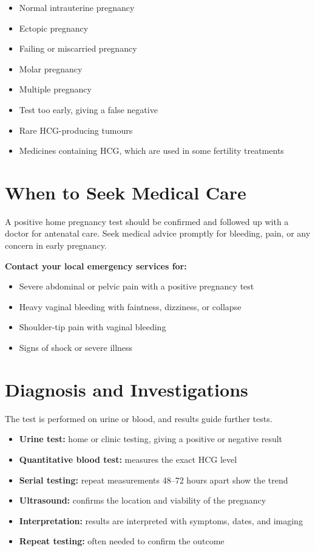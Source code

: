 \begin{itemize}
    \item Normal intrauterine pregnancy
    \item Ectopic pregnancy
    \item Failing or miscarried pregnancy
    \item Molar pregnancy
    \item Multiple pregnancy
    \item Test too early, giving a false negative
    \item Rare HCG-producing tumours
    \item Medicines containing HCG, which are used in some fertility treatments
\end{itemize}

\section*{When to Seek Medical Care}
A positive home pregnancy test should be confirmed and followed up with a doctor for antenatal care. Seek medical advice promptly for bleeding, pain, or any concern in early pregnancy.

\textbf{Contact your local emergency services for:}
\begin{itemize}
    \item Severe abdominal or pelvic pain with a positive pregnancy test
    \item Heavy vaginal bleeding with faintness, dizziness, or collapse
    \item Shoulder-tip pain with vaginal bleeding
    \item Signs of shock or severe illness
\end{itemize}

\section*{Diagnosis and Investigations}
The test is performed on urine or blood, and results guide further tests.

\begin{itemize}
    \item \textbf{Urine test:} home or clinic testing, giving a positive or negative result
    \item \textbf{Quantitative blood test:} measures the exact HCG level
    \item \textbf{Serial testing:} repeat measurements 48--72 hours apart show the trend
    \item \textbf{Ultrasound:} confirms the location and viability of the pregnancy
    \item \textbf{Interpretation:} results are interpreted with symptoms, dates, and imaging
    \item \textbf{Repeat testing:} often needed to confirm the outcome
\end{itemize}

